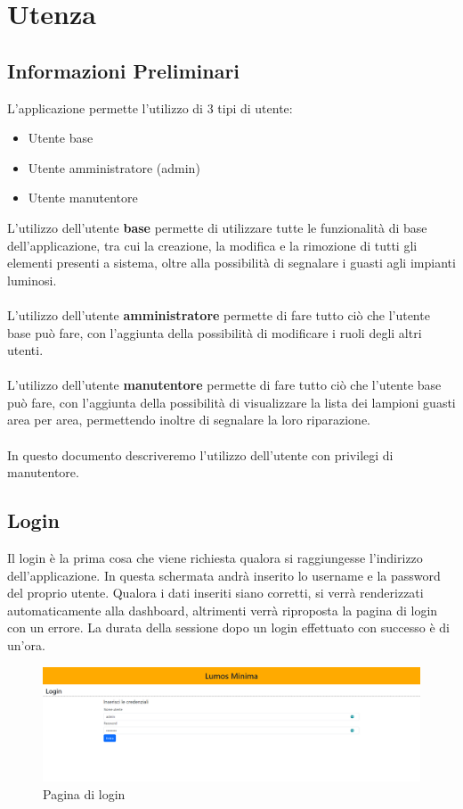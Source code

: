 \documentclass[a4paper, 12pt]{article}
\begin{document}
\newpage
\section{Utenza}
\subsection{Informazioni Preliminari}
L'applicazione permette l'utilizzo di 3 tipi di utente:
\begin{itemize}
    \item Utente base
    \item Utente amministratore (admin)
    \item Utente manutentore
\end{itemize}
L'utilizzo dell'utente \textbf{base} permette di utilizzare tutte le funzionalità di base dell'applicazione, tra cui la creazione, la modifica e la rimozione di tutti gli elementi presenti a sistema, oltre alla possibilità di segnalare i guasti agli impianti luminosi.\\ \\
L'utilizzo dell'utente \textbf{amministratore} permette di fare tutto ciò che l'utente base può fare, con l'aggiunta della possibilità di modificare i ruoli degli altri utenti.\\ \\
L'utilizzo dell'utente \textbf{manutentore} permette di fare tutto ciò che l'utente base può fare, con l'aggiunta della possibilità di visualizzare la lista dei lampioni guasti area per area, permettendo inoltre di segnalare la loro riparazione.\\\\
In questo documento descriveremo l'utilizzo dell'utente con privilegi di manutentore.
\subsection{Login}
Il login è la prima cosa che viene richiesta qualora si raggiungesse l'indirizzo dell'applicazione. In questa schermata andrà inserito lo username e la password del proprio utente. Qualora i dati inseriti siano corretti, si verrà renderizzati automaticamente alla dashboard, altrimenti verrà riproposta la pagina di login con un errore. La durata della sessione dopo un login effettuato con successo è di un'ora.
\begin{figure}[H]
\centering
\includegraphics[width=\textwidth]{login}
\caption{Pagina di login}
\end{figure}
\end{document}

